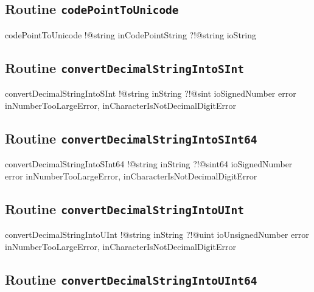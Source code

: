 \subsection{Routine \texttt{codePointToUnicode}}

\begin{galgas}
codePointToUnicode !@string inCodePointString
                   ?!@string ioString
\end{galgas}

\subsection{Routine \texttt{convertDecimalStringIntoSInt}}

\begin{galgas}
convertDecimalStringIntoSInt !@string inString
                             ?!@sint ioSignedNumber
                             error inNumberTooLargeError,
                                   inCharacterIsNotDecimalDigitError
\end{galgas}

\subsection{Routine \texttt{convertDecimalStringIntoSInt64}}

\begin{galgas}
convertDecimalStringIntoSInt64 !@string inString
                               ?!@sint64 ioSignedNumber
                               error inNumberTooLargeError,
                                     inCharacterIsNotDecimalDigitError
\end{galgas}

\subsection{Routine \texttt{convertDecimalStringIntoUInt}}

\begin{galgas}
convertDecimalStringIntoUInt !@string inString
                             ?!@uint ioUnsignedNumber
                             error inNumberTooLargeError,
                                   inCharacterIsNotDecimalDigitError
\end{galgas}

\subsection{Routine \texttt{convertDecimalStringIntoUInt64}}

